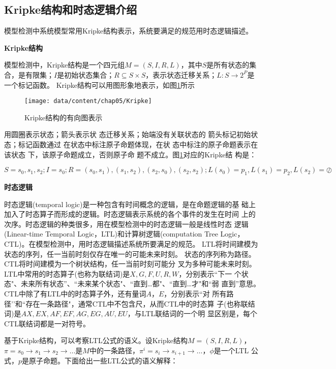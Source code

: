 
\subsection{Kripke结构和时态逻辑介绍}
模型检测中系统模型常用Kripke结构表示，系统要满足的规范用时态逻辑描述。

\textbf{Kripke结构}

模型检测中，Kripke结构是一个四元组$M=(S,I,R,L)$，其中$S$是所有状态的集合，是有限集；$I$是初始状态集合；$R\subseteq S\times S$，表示状态迁移关系；$L:S\to 2^{P}$是一个标记函数。
Kripke结构可以用图形象地表示，如图\ref{fig-kripke}所示
\begin{figure}[htp]
  \centering
  \texttt{[image: data/content/chap05/Kripke]}
  \caption{Kripke结构的有向图表示}
  \label{fig-kripke}
\end{figure}

用圆圈表示状态；箭头表示状
态迁移关系；始端没有关联状态的
箭头标记初始状态；标记函数通过
在状态中标注原子命题体现，在状
态中标注的原子命题表示在该状态
下，该原子命题成立，否则原子命
题不成立。图\ref{fig-kripke}对应的Kripke结
构是：

$S={s_0,s_1,s_2};I={s_0};R={(s_0,s_1),(s_1,s_2),(s_2,s_0),(s_2,s_2)};L(s_0)={p_1},L(s_1)={p_2},L(s_2)=\oslash$




\textbf{时态逻辑}

时态逻辑(temporal logic)是一种包含有时间概念的逻辑，是在命题逻辑的基
础上加入了时态算子而形成的逻辑。时态逻辑表示系统的各个事件的发生在时间
上的次序。时态逻辑的种类很多，用在模型检测中的时态逻辑一般是线性时态
逻辑(Linear-time Temporal Logic，LTL)和计算树逻辑(computation Tree Logic，
CTL)。在模型检测中，用时态逻辑描述系统所要满足的规范。
LTL将时间建模为状态的序列，任一当前时刻仅存在唯一的可能未来时刻。
状态的序列称为路径。CTL将时间建模为一个树状结构，任一当前时刻可能分
叉为多种可能未来时刻。
LTL中常用的时态算子(也称为联结词)是$X,G,F,U,R,W$，分别表示“下一
个状态"、未来所有状态”、“未来某个状态"、“直到…都"、“直到…才"和“弱
直到”意思。CTL中除了有LTL中的时态算子外，还有量词$A，E$，分别表示“对
所有路径’’和“存在一条路径"，通常CTL中不包含尺，从而CTL中的时态算
子(也称联结词)是$AX,EX,AF,EF,AG,EG,AU,EU$，与LTL联结词的一个明
显区别是，每个CTL联结词都是一对符号。

基于Kripke结构，可以考察LTL公式的语义。设Kripke结构$M=(S,I,R,L)$，
$\pi = s_0\to s_1\to s_2 \to \ldots$是$M$中的一条路径，$\pi^i=s_i \to s_{i+1}\to \ldots$，$\phi$是一个LTL
公式，$p$是原子命题。下面给出一些LTL公式的语义解释：

